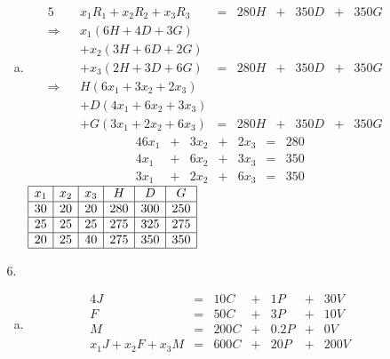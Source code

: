 \documentclass[fleqn]{article}
\begin{document}
\begin{enumerate}[{1}.1]
\begin{itemize}
\begin{enumerate}[(a)]
				\item
				\begin{alignat*}{5}
					&& x_1R_1 + x_2R_2 + x_3R_3 & {}={} & 280H & {}+{} & 350D & {}+{} & 350G \\
					\Rightarrow && x_1\left( 6H + 4D + 3G \right) & & & & & & & \\
					&& + x_2\left( 3H + 6D + 2G \right) & & & & & & & \\
					&& + x_3\left( 2H + 3D + 6G \right) & {}={} & 280H & {}+{} & 350D & {}+{} & 350G \\
					\Rightarrow && H\left( 6x_1 + 3x_2 + 2x_3 \right) & & & & & & & \\
					&& + D\left( 4x_1 + 6x_2 + 3x_3 \right) & & & & & & & \\
					&& + G\left( 3x_1 + 2x_2 + 6x_3 \right) & {}={} & 280H & {}+{} & 350D & {}+{} & 350G 
				\end{alignat*}
				\begin{alignat*}{4}
					6x_1 & {}+{} & 3x_2 & {}+{} & 2x_3 & {}={} & 280\\
					4x_1 & {}+{} & 6x_2 & {}+{} & 3x_3 & {}={} & 350\\
					3x_1 & {}+{} & 2x_2 & {}+{} & 6x_3 & {}={} & 350
				\end{alignat*}
				\centering
				$\begin{array}{|c|c|c|c|c|c|}
					\hline
					x_1 & x_2 & x_3 & H & D & G \\
					\hline
					30 & 20 & 20 & 280 & 300 & 250 \\
					\hline
					25 & 25 & 25 & 275 & 325 & 275 \\
					\hline
					20 & 25 & 40 & 275 & 350 & 350 \\
					\hline
				\end{array}$
			\end{enumerate}
			
			\item [6.] \quad
			\begin{enumerate}[(a)]
				\item 
				\begin{alignat*}{4}
					J & {}={} & 10C & {}+{} & 1P & {}+{} & 30V \\
					F & {}={} & 50C & {}+{} & 3P & {}+{} & 10V \\
					M & {}={} & 200C & {}+{} & 0.2P & {}+{} & 0V \\
					x_1J + x_2F + x_3M & {}={} & 600C & {}+{} & 20P & {}+{} & 200V \\
				\end{alignat*}
			\end{enumerate}
		\end{itemize}
		

\end{enumerate}
\end{document}
